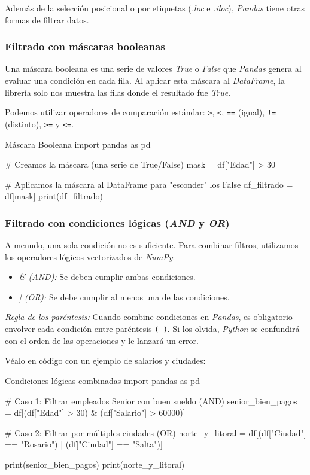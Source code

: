 Además de la selección posicional o por etiquetas (\textit{.loc} e \textit{.iloc}), \textit{Pandas} tiene otras formas de filtrar datos.

\subsubsection{Filtrado con máscaras booleanas}

Una máscara booleana es una serie de valores \textit{True} o \textit{False} que \textit{Pandas} genera al evaluar una condición en cada fila. Al aplicar esta máscara al \textit{DataFrame}, la librería solo nos muestra las filas donde el resultado fue \textit{True}.

Podemos utilizar operadores de comparación estándar: \texttt{>}, \texttt{<}, \texttt{==} (igual), \texttt{!=} (distinto), \texttt{>=} y \texttt{<=}.

\begin{pycode}{Máscara Booleana}
import pandas as pd

# Creamos la máscara (una serie de True/False)
mask = df["Edad"] > 30

# Aplicamos la máscara al DataFrame para "esconder" los False
df_filtrado = df[mask]
print(df_filtrado)
\end{pycode}

\subsubsection{Filtrado con condiciones lógicas (\textit{AND} y \textit{OR})}

A menudo, una sola condición no es suficiente. Para combinar filtros, utilizamos los operadores lógicos vectorizados de \textit{NumPy}:
\begin{itemize}
\item \textit{\& (AND):} Se deben cumplir ambas condiciones.
\item \textit{| (OR):} Se debe cumplir al menos una de las condiciones.
\end{itemize}

\begin{nota}
\textit{Regla de los paréntesis:} Cuando combine condiciones en \textit{Pandas}, es obligatorio envolver cada condición entre paréntesis \texttt{( )}. Si los olvida, \textit{Python} se confundirá con el orden de las operaciones y le lanzará un error.
\end{nota}

Véalo en código con un ejemplo de salarios y ciudades:

\begin{pycode}{Condiciones lógicas combinadas}
import pandas as pd

# Caso 1: Filtrar empleados Senior con buen sueldo (AND)
senior_bien_pagos = df[(df["Edad"] > 30) & (df["Salario"] > 60000)]

# Caso 2: Filtrar por múltiples ciudades (OR)
norte_y_litoral = df[(df["Ciudad"] == "Rosario") | (df["Ciudad"] == "Salta")]

print(senior_bien_pagos)
print(norte_y_litoral)
\end{pycode}

